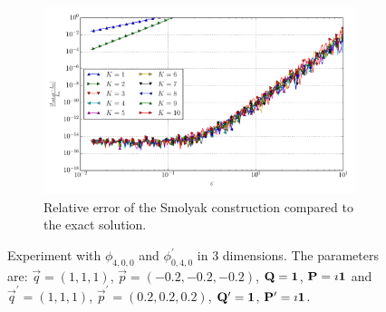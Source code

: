 \documentclass[a4paper,10pt]{article}
\begin{document}
\begin{figure}[ht!]
\begin{subfigure}[t]{0.5\linewidth}
    \includegraphics[width=\linewidth]{./plots/tp_sg_3d_conv_eps_(4,0,0)_(0,4,0)_err_rel_nsd_gk.pdf}
    \caption{Relative error of the Smolyak construction compared to the exact solution.}
    \label{fig:tp_sg_3d_conv_eps_400_040_err_rel_nsd_gk}
  \end{subfigure}
  \label{fig:tp_sg_3d_conv_eps_400_040}
  \caption{Experiment with $\phi_{4,0,0}$ and $\phi_{0,4,0}^{\prime}$
  in 3 dimensions.
  The parameters are:
  $\vec{q} = (1, 1, 1)$,
  $\vec{p} = (-0.2, -0.2, -0.2)$,
  $\mathbf{Q} = \mathbf{1}$,
  $\mathbf{P} = \imath \mathbf{1}$
  and
  $\vec{q}^\prime = (1, 1, 1)$,
  $\vec{p}^\prime = (0.2, 0.2, 0.2)$,
  $\mathbf{Q}^\prime = \mathbf{1}$,
  $\mathbf{P}^\prime = \imath \mathbf{1}$.}
\end{figure}
\end{document}
